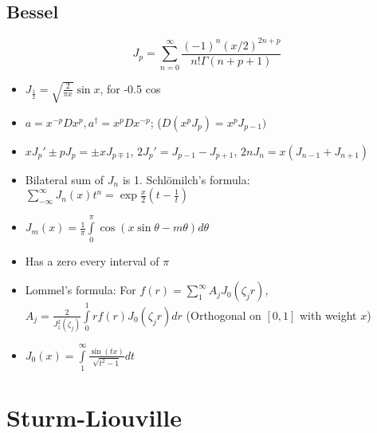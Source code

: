 \documentclass[12pt]{article}
\begin{document}
\subsection{Bessel}
$$J_p=\sum\limits_{n=0}^\infty \frac{(-1)^n (x/2)^{2n+p}}{n!\Gamma(n+p+1)}$$
\begin{itemize}




\item $J_\frac12=\sqrt{\frac{2}{\pi x}}\sin x$, for -0.5 cos

\item $a=x^{-p}Dx^p, a^\dagger = x^pDx^{-p}$; ($D(x^pJ_p)=x^pJ_{p-1})$
\item $xJ_p' \pm pJ_p=\pm xJ_{p\mp 1}$, $2J_p'=J_{p-1}-J_{p+1}$, $2nJ_n=x(J_{n-1}+J_{n+1})$

\item Bilateral sum of $J_n$ is 1.
Schl\"{o}milch's formula: $\sum\limits_{-\infty}^{\infty}J_n(x)t^n=\exp \frac{x}2\left(t-\frac1{t}\right)$
\item $J_m(x)=\frac1\pi\int\limits_0^\pi\cos(x\sin\theta-m\theta)d\theta$
\item Has a zero every interval of $\pi$
\item Lommel's formula: For $f(r)=\sum\limits_1^\infty A_jJ_0(\zeta_jr)$, $A_j=\frac{2}{J_1^2(\zeta_j)}\int\limits_0^1rf(r)J_0(\zeta_jr)dr$ (Orthogonal on $[0,1]$ with weight $x$)
\item $J_0(x)=\int\limits_1^\infty \frac{\sin (t x)}{\sqrt{t^2-1}} dt$
\end{itemize}
\section{Sturm-Liouville}
\end{document}
